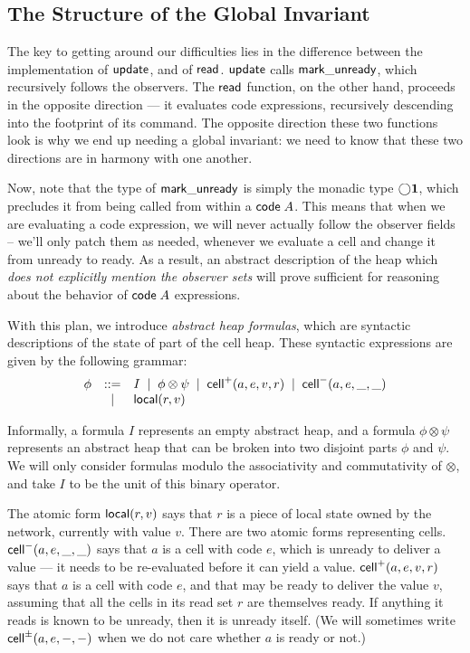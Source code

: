 \subsection{The Structure of the Global Invariant}

The key to getting around our difficulties lies in the difference
between the implementation of $\mathsf{update}$, and of $\mathsf{read}$.
$\mathsf{update}$ calls $\mathsf{mark\_unready}$, which recursively follows
the observers. The $\mathsf{read}$ function, on the other hand,
proceeds in the opposite direction --- it evaluates code expressions,
recursively descending into the footprint of its command. The opposite
direction these two functions look is why we end up needing a global
invariant: we need to know that these two directions are in harmony
with one another.

Now, note that the type of $\mathsf{mark\_unready}$ is simply the monadic
type $\bigcirc{\mathbf{1}}$, which precludes it from being called from within
a $\mathsf{code}\;{A}$. This means that when we are evaluating a code
expression, we will never actually follow the observer fields --
we'll only patch them as needed, whenever we evaluate a
cell and change it from unready to ready.  As a result, an abstract
description of the heap which \emph{does not explicitly mention
the observer sets} will prove sufficient for reasoning about
the behavior of $\mathsf{code}\;{A}$ expressions.

With this plan, we introduce \emph{abstract heap formulas}, which are
syntactic descriptions of the state of part of the cell heap. These
syntactic expressions are given by the following grammar:
\begin{displaymath}
  \begin{array}{lcl}
    \phi & ::= & I \;\;|\;\; \phi \otimes \psi \;\;|\;\; \mathsf{cell}^{+}({a}, {e}, {v}, {r}) \;\;|\;\; \mathsf{cell}^{-}({a}, {e}, {\_}, {\_})\\
         &  |  & \mathsf{local}({r}, {v}) 
  \end{array}
\end{displaymath}

Informally, a formula $I$ represents an empty abstract heap, and a
formula $\phi \otimes \psi$ represents an abstract heap that can be
broken into two disjoint parts $\phi$ and $\psi$. We will only
consider formulas modulo the associativity and commutativity of
$\otimes$, and take $I$ to be the unit of this binary operator.

The atomic form $\mathsf{local}({r}, {v})$ says that $r$ is a piece of local
state owned by the network, currently with value $v$. There are two
atomic forms representing cells. $\mathsf{cell}^{-}({a}, {e}, {\_}, {\_})$ says that $a$ is a
cell with code $e$, which is unready to deliver a value --- it needs
to be re-evaluated before it can yield a value. $\mathsf{cell}^{+}({a}, {e}, {v}, {r})$
says that $a$ is a cell with code $e$, and that may be ready to deliver
the value $v$, assuming that all the cells in its read set $r$ are themselves
ready. If anything it reads is known to be unready, then it is unready
itself. (We will sometimes write $\mathsf{cell}^{\pm}({a}, {e}, {-}, {-})$ when we do not care
whether $a$ is ready or not.)

